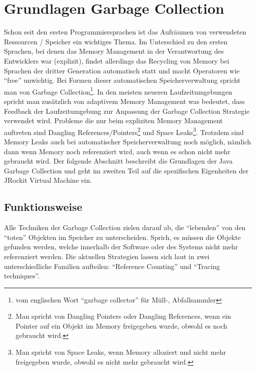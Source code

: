 \chapter{Grundlagen Garbage Collection}
Schon seit den ersten Programmiersprachen ist das Aufräumen von verwendeten Ressourcen / Speicher ein wichtiges Thema. Im Unterschied zu den ersten Sprachen, bei denen das Memory Management in der Verantwortung des Entwicklers war (explizit), findet allerdings das Recycling von Memory bei Sprachen der dritter Generation automatisch statt und macht Operatoren wie ``free'' unwichtig. Bei Formen dieser automatischen Speicherverwaltung spricht man von Garbage Collection\footnote{vom englischen Wort ``garbage collector'' für Müll-, Abfallsammler}. In den meisten neueren Laufzeitumgebungen spricht man zusätzlich von adaptivem Memory Management was bedeutet, dass Feedback der Laufzeitumgebung zur Anpassung der Garbage Collection Strategie verwendet wird.
Probleme die nur beim expliziten Memory Management auftreten sind  Dangling References/Pointers\footnote{Man spricht von Dangling Pointers oder Dangling References, wenn ein Pointer auf ein Objekt im Memory freigegeben wurde, obwohl es noch gebraucht wird.} und Space Leaks\footnote{Man spricht von Space Leaks, wenn Memory alloziert und nicht mehr freigegeben wurde, obwohl es nicht mehr gebraucht wird.\cite{sunMemoryManagementWP}}. Trotzdem sind Memory Leaks auch bei automatischer Speicherverwaltung noch möglich, nämlich dann wenn Memory noch referenziert wird, auch wenn es schon nicht mehr gebraucht wird.
Der folgende Abschnitt beschreibt die Grundlagen der Java Garbage Collection und geht im zweiten Teil auf die spezifischen Eigenheiten der JRockit Virtual Machine ein.

\section{Funktionsweise}
Alle Techniken der Garbage Collection zielen darauf ab, die ``lebenden'' von den ``toten'' Objekten im Speicher zu unterscheiden. Sprich, es müssen die Objekte gefunden werden, welche innerhalb der Software oder des Systems nicht mehr referenziert werden. Die aktuellen Strategien lassen sich laut\cite[S. 77]{lagergren2010oracle} in zwei unterschiedliche Familien aufteilen: ``Reference Counting'' und ``Tracing techniques''.

